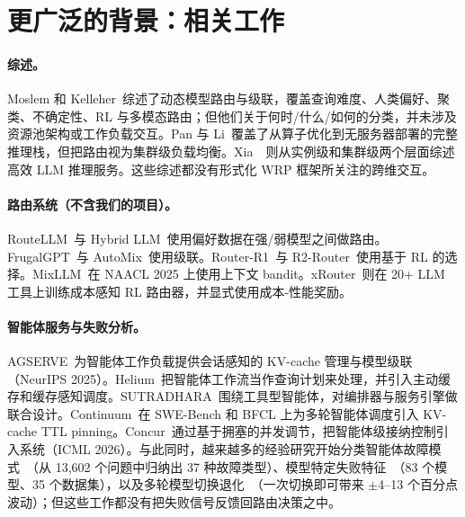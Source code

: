 \section{更广泛的背景：相关工作}
\label{sec:related}

\paragraph{综述。}
Moslem 和 Kelleher~\cite{moslem2026routingsurvey}综述了动态模型路由与级联，覆盖查询难度、人类偏好、聚类、不确定性、RL 与多模态路由；但他们关于何时/什么/如何的分类，并未涉及资源池架构或工作负载交互。Pan 与 Li~\cite{pan2025survey}覆盖了从算子优化到无服务器部署的完整推理栈，但把路由视为集群级负载均衡。Xia~\etal~\cite{xia2025taming}则从实例级和集群级两个层面综述高效 LLM 推理服务。这些综述都没有形式化 WRP 框架所关注的跨维交互。

\paragraph{路由系统（不含我们的项目）。}
RouteLLM~\cite{ong2025routellm}与 Hybrid LLM~\cite{ding2024hybrid}使用偏好数据在强/弱模型之间做路由。FrugalGPT~\cite{chen2023frugalgpt}与 AutoMix~\cite{madaan2024automix}使用级联。Router-R1~\cite{routerr1_2025}与 R2-Router~\cite{r2router2026}使用基于 RL 的选择。MixLLM~\cite{lu2025mixllm}在 NAACL 2025 上使用上下文 bandit。xRouter~\cite{xrouter2025}则在 20+ LLM 工具上训练成本感知 RL 路由器，并显式使用成本-性能奖励。

\paragraph{智能体服务与失败分析。}
AGSERVE~\cite{agserve2025}为智能体工作负载提供会话感知的 KV-cache 管理与模型级联（NeurIPS 2025）。Helium~\cite{helium2026}把智能体工作流当作查询计划来处理，并引入主动缓存和缓存感知调度。SUTRADHARA~\cite{sutradhara2026}围绕工具型智能体，对编排器与服务引擎做联合设计。Continuum~\cite{continuum2025}在 SWE-Bench 和 BFCL 上为多轮智能体调度引入 KV-cache TTL pinning。Concur~\cite{concur2026}通过基于拥塞的并发调节，把智能体级接纳控制引入系统（ICML 2026）。与此同时，越来越多的经验研究开始分类智能体故障模式~\cite{agenticfaults2026}（从 13,602 个问题中归纳出 37 种故障类型）、模型特定失败特征~\cite{erroratlas2026}（83 个模型、35 个数据集），以及多轮模型切换退化~\cite{handoffdrift2026}（一次切换即可带来 $\pm$4--13 个百分点波动）；但这些工作都没有把失败信号反馈回路由决策之中。

